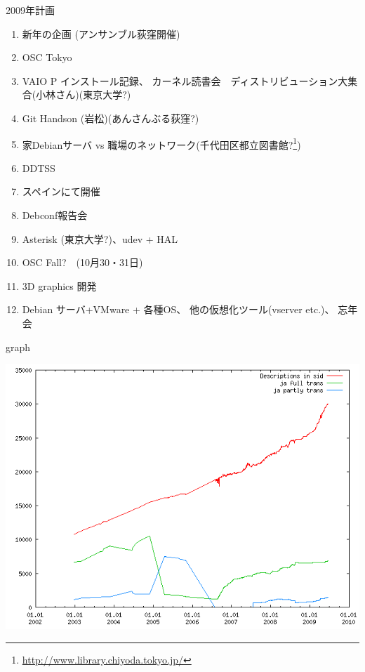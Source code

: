 \begin{frame}{2009年計画}

{\scriptsize
 \begin{enumerate}
  \item 新年の企画 (アンサンブル荻窪開催)
  \item OSC Tokyo
  \item VAIO P インストール記録、
	カーネル読書会　ディストリビューション大集合(小林さん)(東京大学?)
  \item Git Handson (岩松)(あんさんぶる荻窪?)
  \item 家Debianサーバ vs 職場のネットワーク(千代田区都立図書館?\footnote{\url{http://www.library.chiyoda.tokyo.jp/}})
  \item DDTSS 
  \item スペインにて開催
  \item Debconf報告会
  \item Asterisk (東京大学?)、udev + HAL
  \item OSC Fall?　(10月30・31日)
  \item 3D graphics 開発 
  \item Debian サーバ+VMware + 各種OS、
	他の仮想化ツール(vserver etc.)、
	忘年会
 \end{enumerate}
}
\end{frame}


\begin{frame}{graph}

\includegraphics[width=1\hsize]{image200906/stat-trans-sid-ja.png}
 
\end{frame}

